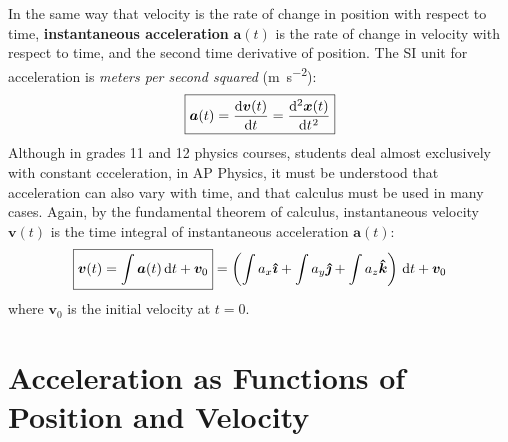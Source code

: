 \documentclass{../../oss-handout}
\begin{document}
In the same way that velocity is the rate of change in position with respect
to time, \textbf{instantaneous acceleration} $\bm a(t)$ is the rate of change
in velocity with respect to time, and the second time derivative of position.
The SI unit for acceleration is \emph{meters per second squared}
(\si{\metre\per\second\squared}):
\begin{equation}
  \boxed{\bm a(t)= \diff{\bm v(t)}t=\diff[2]{\bm x(t)}t}
\end{equation}
Although in grades 11 and 12 physics courses, students deal almost exclusively
with constant ccceleration, in AP Physics, it must be understood that
acceleration can also vary with time, and that calculus must be used in many
cases.
Again, by the fundamental theorem of calculus, instantaneous velocity
$\bm v(t)$ is the time integral of instantaneous acceleration $\bm a(t)$:
\begin{equation}
  \boxed{\bm v(t)=\int\bm a(t)\dl t+\bm v_0} =
  \left(
  \int a_x\bm{\hat\imath} +
  \int a_y\bm{\hat\jmath} +
  \int a_z\bm{\hat k}
  \right)\dl t +\bm v_0
\end{equation}
where $\bm v_0$ is the initial velocity at $t=0$.

\section{Acceleration as Functions of Position and Velocity}
\end{document}
